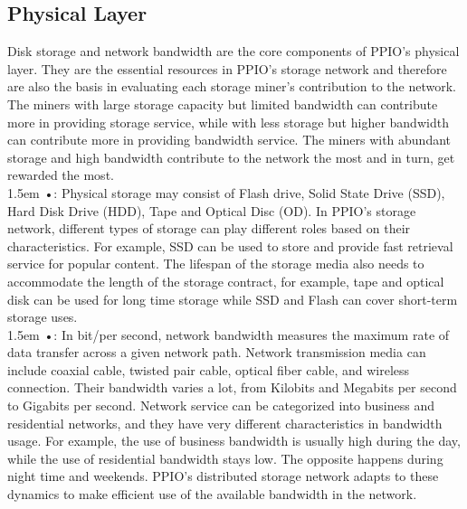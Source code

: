 \documentclass[10pt,a4paper]{article}
\begin{document}
     \subsection{Physical Layer} %
Disk storage and network bandwidth are the core components of PPIO’s physical layer. They are the essential resources in PPIO’s storage network and therefore are also the basis in evaluating each storage miner’s contribution to the network. The miners with large storage capacity but limited bandwidth can contribute more in providing storage service, while with less storage but higher bandwidth can contribute more in providing bandwidth service. The miners with abundant storage and high bandwidth contribute to the network the most and in turn, get rewarded the most.
\vspace{-0.8em}
\\

\hangindent 1.5em
\noindent   
•: Physical storage may consist of Flash drive, Solid State Drive (SSD), Hard Disk Drive (HDD), Tape and Optical Disc (OD). In PPIO’s storage network, different types of storage can play different roles based on their characteristics. For example, SSD can be used to store and provide fast retrieval service for popular content. The lifespan of the storage media also needs to accommodate the length of the storage contract, for example, tape and optical disk can be used for long time storage while SSD and Flash can cover short-term storage uses.
\vspace{-0.8em}
\\

\hangindent 1.5em
\noindent   
•: In bit/per second, network bandwidth measures the maximum rate of data transfer across a given network path. Network transmission media can include coaxial cable, twisted pair cable, optical fiber cable, and wireless connection. Their bandwidth varies a lot, from Kilobits and Megabits per second to Gigabits per second. Network service can be categorized into business and residential networks, and they have very different characteristics in bandwidth usage. For example, the use of business bandwidth is usually high during the day, while the use of residential bandwidth stays low. The opposite happens during night time and weekends. PPIO’s distributed storage network adapts to these dynamics to make efficient use of the available bandwidth in the network.
\vspace{-0.5em}
\end{document}
